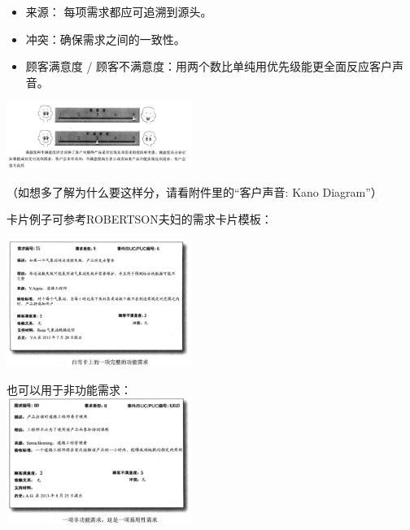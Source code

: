 \begin{itemize}
\tightlist
\item
  来源： 每项需求都应可追溯到源头。
\end{itemize}

\begin{itemize}
\tightlist
\item
  冲突：确保需求之间的一致性。
\end{itemize}

\begin{itemize}
\tightlist
\item
  顾客满意度 /
  顾客不满意度：用两个数比单纯用优先级能更全面反应客户声音。
\end{itemize}


\includegraphics[width=6cm]{9_用户故事1.png}

\begin{description}
\tightlist
\item[]
（如想多了解为什么要这样分，请看附件里的``客户声音: Kano Diagram''）
\end{description}

卡片例子可参考ROBERTSON夫妇的需求卡片模板：


\includegraphics[width=6cm]{9_用户故事2.png}

也可以用于非功能需求：\\

\includegraphics[width=6cm]{9_用户故事3.png}


